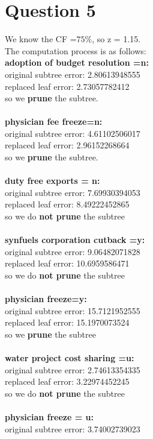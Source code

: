 \documentclass[paper=a4, fontsize=13pt]{article} %
\begin{document}
\section{Question 5}
We know the CF =$75\%$, so z = 1.15. \\
The computation process is as follows:\\
\textbf{adoption of budget resolution =n:}\\
original subtree error:  2.80613948555\\
replaced leaf error:  2.73057782412\\
so we \textbf{prune} the subtree.\\
\\
\textbf{physician fee freeze=n:}\\
original subtree error:  4.61102506017\\
replaced leaf error:  2.96152268664\\
so we \textbf{prune} the subtree.
\\
\\
\textbf{duty free exports = n: }\\
original subtree error:  7.69930394053\\
replaced leaf error:  8.49222452865\\
so we do \textbf{not prune} the subtree
\\
\\
\textbf{synfuels corporation cutback =y:}\\
original subtree error:  9.06482071828\\
replaced leaf error:  10.6959586471\\
so we do \textbf{not prune} the subtree
\\
\\
\textbf{physician freeze=y:}\\
original subtree error:  15.7121952555\\
replaced leaf error:  15.1970073524\\
so we \textbf{prune} the subtree
\\
\\
\textbf{water project cost sharing =u:}\\
original subtree error:  2.74613354335\\
replaced leaf error:  3.22974452245\\
so we do \textbf{not prune} the subtree
\\
\\
\textbf{physician freeze = u:}\\
original subtree error:  3.74002739023\\
\end{document}
